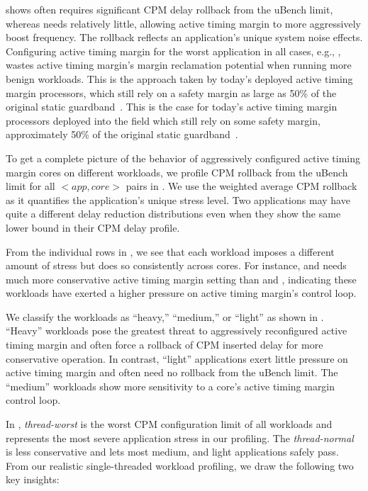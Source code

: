  shows  often requires significant CPM delay rollback from the uBench limit, whereas  needs relatively little, allowing active timing margin to more aggressively boost frequency. The rollback reflects an application's unique system noise effects. Configuring active timing margin for the worst application in all cases, e.g., , wastes active timing margin's margin reclamation potential when running more benign workloads. This is the approach taken by today's deployed active timing margin processors, which still rely on a safety margin as large as 50\% of the original static guardband~\cite{lefurgy2011active}. This is the case for today's active timing margin processors deployed into the field which still rely on some safety margin, approximately 50\% of the original static guardband~\cite{lefurgy2011active}.

To get a complete picture of the behavior of aggressively configured active timing margin cores on different workloads, we profile CPM rollback from the uBench limit for all $<app, core>$ pairs in . We use the weighted average CPM rollback as it quantifies the application's unique stress level. Two applications may have quite a different delay reduction distributions even when they show the same lower bound in their CPM delay profile. 

From the individual rows in , we see that each workload imposes a different amount of stress but does so consistently across cores. For instance,  and  needs much more conservative active timing margin setting than  and , indicating these workloads have exerted a higher pressure on active timing margin's control loop.

We classify the workloads as ``heavy,'' ``medium,'' or ``light'' as shown in . ``Heavy'' workloads pose the greatest threat to aggressively reconfigured active timing margin and often force a rollback of CPM inserted delay for more conservative operation. In contrast, ``light'' applications exert little pressure on active timing margin and often need no rollback from the uBench limit. The ``medium'' workloads show more sensitivity to a core's active timing margin control loop.

In , \textit{thread-worst} is the worst CPM configuration limit of all workloads and represents the most severe application stress in our profiling. The \textit{thread-normal} is less conservative and lets most medium, and light applications safely pass. From our realistic single-threaded workload profiling, we draw the following two key insights:

